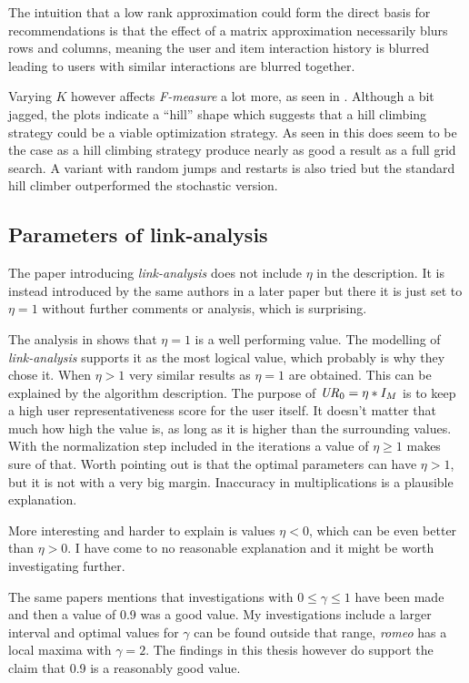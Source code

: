 The intuition that a low rank approximation could form the direct basis for recommendations is that the effect of a matrix approximation necessarily blurs rows and columns, meaning the user and item interaction history is blurred leading to users with similar interactions are blurred together.

Varying $K$ however affects \textit{F-measure} a lot more, as seen in . Although a bit jagged, the plots indicate a ``hill'' shape which suggests that a hill climbing strategy could be a viable optimization strategy. As seen in  this does seem to be the case as a hill climbing strategy produce nearly as good a result as a full grid search. A variant with random jumps and restarts is also tried but the standard hill climber outperformed the stochastic version.

\subsection{Parameters of link-analysis}

The paper introducing \textit{link-analysis} \cite{huang2004link} does not include $\eta$ in the description. It is instead introduced by the same authors in a later paper \cite{huang2007comparison} but there it is just set to $\eta = 1$ without further comments or analysis, which is surprising.

The analysis in  shows that $\eta = 1$ is a well performing value. The modelling of \textit{link-analysis} supports it as the most logical value, which probably is why they chose it. When $\eta > 1$ very similar results as $\eta = 1$ are obtained. This can be explained by the algorithm description. The purpose of $\mathit{UR}_0 = \eta * I_M$ is to keep a high user representativeness score for the user itself. It doesn't matter that much how high the value is, as long as it is higher than the surrounding values. With the normalization step included in the iterations a value of $\eta \geq 1$ makes sure of that. Worth pointing out is that the optimal parameters can have $\eta > 1$, but it is not with a very big margin. Inaccuracy in multiplications is a plausible explanation.

More interesting and harder to explain is values $\eta < 0$, which can be even better than $\eta > 0$. I have come to no reasonable explanation and it might be worth investigating further.

The same papers \cite{huang2004link, huang2007comparison} mentions that investigations with $0 \leq \gamma \leq 1$ have been made and then a value of 0.9 was a good value. My investigations include a larger interval and optimal values for $\gamma$ can be found outside that range, \textit{romeo} has a local maxima with $\gamma = 2$. The findings in this thesis however do support the claim that 0.9 is a reasonably good value.

